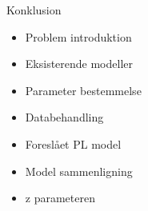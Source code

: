 \begin{frame}{Konklusion}
	\begin{minipage}{0.5\textwidth}
		\begin{itemize}
		\item Problem introduktion
		\item Eksisterende modeller
		\item Parameter bestemmelse
		\item Databehandling
		\item Foreslået PL model
		\item Model sammenligning
		\item z parameteren
		\end{itemize}
	\end{minipage}%
	\begin{minipage}{0.5\textwidth}
		\resizebox{\textwidth}{!}{
		
		}
	\end{minipage}%
\end{frame}